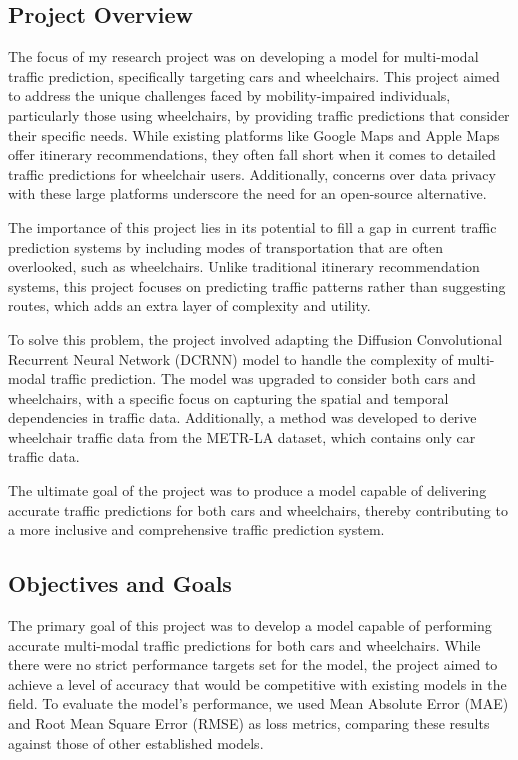 \subsection{Project Overview}\label{subsec:project-overview}
The focus of my research project was on developing a model for multi-modal traffic prediction, specifically targeting
cars and wheelchairs.
This project aimed to address the unique challenges faced by mobility-impaired individuals, particularly those using
wheelchairs, by providing traffic predictions that consider their specific needs.
While existing platforms like Google Maps and Apple Maps offer itinerary recommendations, they often fall short when it
comes to detailed traffic predictions for wheelchair users.
Additionally, concerns over data privacy with these large platforms underscore the need for an open-source alternative.

The importance of this project lies in its potential to fill a gap in current traffic prediction systems by including
modes of transportation that are often overlooked, such as wheelchairs.
Unlike traditional itinerary recommendation systems, this project focuses on predicting traffic patterns rather than
suggesting routes, which adds an extra layer of complexity and utility.

To solve this problem, the project involved adapting the Diffusion Convolutional Recurrent Neural Network (DCRNN) model
to handle the complexity of multi-modal traffic prediction.
The model was upgraded to consider both cars and wheelchairs, with a specific focus on capturing the spatial and
temporal dependencies in traffic data.
Additionally, a method was developed to derive wheelchair traffic data from the METR-LA dataset, which contains only car
traffic data.

The ultimate goal of the project was to produce a model capable of delivering accurate traffic predictions for both cars
and wheelchairs, thereby contributing to a more inclusive and comprehensive traffic prediction system.

\subsection{Objectives and Goals}\label{subsec:objectives-and-goals}
The primary goal of this project was to develop a model capable of performing accurate multi-modal traffic predictions
for both cars and wheelchairs.
While there were no strict performance targets set for the model, the project aimed to achieve a level of accuracy that
would be competitive with existing models in the field.
To evaluate the model's performance, we used Mean Absolute Error (MAE) and Root Mean Square Error (RMSE) as loss
metrics, comparing these results against those of other established models.

